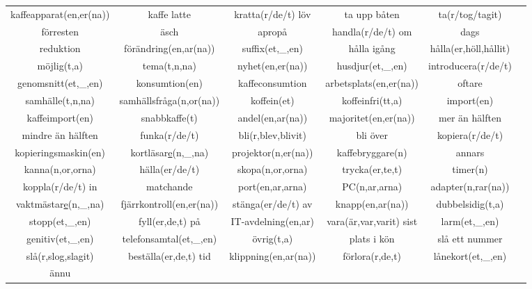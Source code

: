 
\begin{center}
    \begin{adjustwidth}{-2.4cm}{}
        \begin{tabular}{|c c c c c c|}
            \hline
            kaffeapparat(en,er(na)) & kaffe latte & kratta(r/de/t) löv & ta upp båten & ta(r/tog/tagit) &  \\
            förresten & äsch & apropå & handla(r/de/t) om & dags &  \\
            reduktion & förändring(en,ar(na)) & suffix(et,\_,en) & hålla igång & hålla(er,höll,hållit) &  \\
            möjlig(t,a) & tema(t,n,na) & nyhet(en,er(na)) & husdjur(et,\_,en) & introducera(r/de/t) &  \\
            genomsnitt(et,\_,en) & konsumtion(en) & kaffeconsumtion & arbetsplats(en,er(na)) & oftare &  \\
            samhälle(t,n,na) & samhällsfråga(n,or(na)) & koffein(et) & koffeinfri(tt,a) & import(en) &  \\
            kaffeimport(en) & snabbkaffe(t) & andel(en,ar(na)) & majoritet(en,er(na)) & mer än hälften &  \\
            mindre än hälften & funka(r/de/t) & bli(r,blev,blivit) & bli över & kopiera(r/de/t) &  \\
            kopieringsmaskin(en) & kortläsar\underline{e}(n,\_,na) & projektor(n,er(na)) & kaffebryggare(n) & annars &  \\
            kanna(n,or,orna) & hälla(er/de/t) & skopa(n,or,orna) & trycka(er,te,t) & timer(n) &  \\
            koppla(r/de/t) in & matchande & port(en,ar,arna) & PC(n,ar,arna) & adapter(n,rar(na)) &  \\
            vaktmästar\underline{e}(n,\_,na) & fjärrkontroll(en,er(na)) & stänga(er/de/t) av & knapp(en,ar(na)) & dubbelsidig(t,a) &  \\
            stopp(et,\_,en) & fyll(er,de,t) på & IT-avdelning(en,ar) & vara(är,var,varit) sist & larm(et,\_,en) &  \\
            genitiv(et,\_,en) & telefonsamtal(et,\_,en) & övrig(t,a) & plats i kön & slå ett nummer &  \\
            slå(r,slog,slagit) & beställa(er,de,t) tid & klippning(en,ar(na)) & förlora(r,de,t) & lånekort(et,\_,en) &  \\
            ännu &  &  &  &  &  \\

\end{tabular}
\end{adjustwidth}
\end{center}
